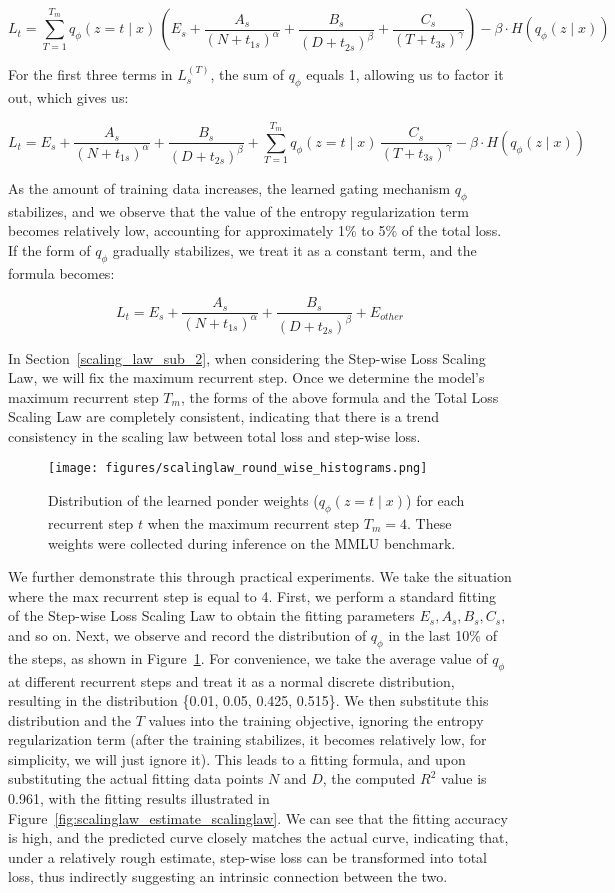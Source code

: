 \documentclass[]{bytedance_seed}
\newcommand{\1}{\mathbf{1}}
\begin{document}
$$
L_t = \sum_{T=1}^{T_{m}} q_\phi(z=t \mid x)\, \left(E_s + \frac{A_s}{(N+t_{1s})^\alpha} + \frac{B_s}{(D+t_{2s})^\beta} + \frac{C_s}{(T+t_{3s})^\gamma}\right) - \beta \cdot H(q_\phi(z \mid x))
$$

For the first three terms in $L_s^{(T)}$, the sum of $q_\phi$ equals 1, allowing us to factor it out, which gives us:

$$
L_t = E_s + \frac{A_s}{(N+t_{1s})^\alpha} + \frac{B_s}{(D+t_{2s})^\beta} + \sum_{T=1}^{T_{m}} q_\phi(z=t \mid x)\, \frac{C_s}{(T+t_{3s})^\gamma} - \beta \cdot H(q_\phi(z \mid x))
$$

As the amount of training data increases, the learned gating mechanism $q_\phi$ stabilizes, and we observe that the value of the entropy regularization term becomes relatively low, accounting for approximately 1\% to 5\% of the total loss. If the form of $q_\phi$ gradually stabilizes, we treat it as a constant term, and the formula becomes:

$$
L_t = E_s + \frac{A_s}{(N+t_{1s})^\alpha} + \frac{B_s}{(D+t_{2s})^\beta} + E_{other}
$$

In Section~\ref{scaling_law_sub_2}, when considering the Step-wise Loss Scaling Law, we will fix the maximum recurrent step. Once we determine the model's maximum recurrent step $T_m$, the forms of the above formula and the Total Loss Scaling Law are completely consistent, indicating that there is a trend consistency in the scaling law between total loss and step-wise loss. 

\begin{figure}
    \centering
    \texttt{[image: figures/scalinglaw\_round\_wise\_histograms.png]}
    \caption{Distribution of the learned ponder weights ($q_\phi(z=t \mid x)$) for each recurrent step $t$ when the maximum recurrent step $T_m=4$. These weights were collected during inference on the MMLU benchmark.}
    \label{fig:round_wise_his}
\end{figure}
We further demonstrate this through practical experiments. We take the situation where the max recurrent step is equal to 4. First, we perform a standard fitting of the Step-wise Loss Scaling Law to obtain the fitting parameters $E_s, A_s, B_s, C_s,$ and so on. Next, we observe and record the distribution of $q_\phi$ in the last 10\% of the steps, as shown in Figure~\ref{fig:round_wise_his}. For convenience, we take the average value of $q_\phi$ at different recurrent steps and treat it as a normal discrete distribution, resulting in the distribution \{0.01, 0.05, 0.425, 0.515\}. We then substitute this distribution and the $T$ values into the training objective, ignoring the entropy regularization term (after the training stabilizes, it becomes relatively low, for simplicity, we will just ignore it). This leads to a fitting formula, and upon substituting the actual fitting data points $N$ and $D$, the computed $R^2$ value is 0.961, with the fitting results illustrated in Figure~\ref{fig:scalinglaw_estimate_scalinglaw}. We can see that the fitting accuracy is high, and the predicted curve closely matches the actual curve, indicating that, under a relatively rough estimate, step-wise loss can be transformed into total loss, thus indirectly suggesting an intrinsic connection between the two.
\end{document}
